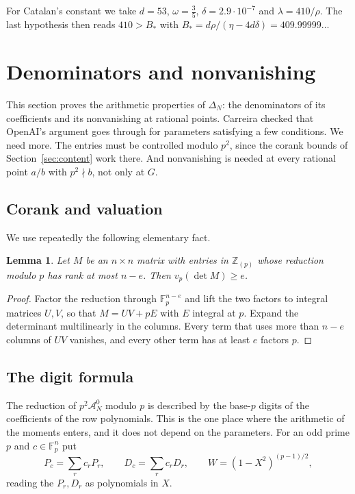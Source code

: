 \documentclass[11pt]{amsart}
\newcommand{\Bstar}{409.99999}
\newtheorem{lemma}[theorem]{Lemma}
\theoremstyle{definition}
\theoremstyle{remark}
\numberwithin{equation}{section}
\newcommand{\Z}{\mathbb Z}
\newcommand{\F}{\mathbb F}
\newcommand{\cA}{\mathcal A}
\begin{document}
For Catalan's constant we take $d=53$, $\omega=\frac35$, $\delta=2.9\cdot10^{-7}$ and $\lambda=410/\rho$.
The last hypothesis then reads $410>B_*$ with $B_*=d\rho/(\eta-4d\delta)=\Bstar\ldots$

\section{Denominators and nonvanishing}\label{sec:setup}

This section proves the arithmetic properties of $\Delta_N$: the denominators of its coefficients and its
nonvanishing at rational points. Carreira \cite{Carreira2026} checked that OpenAI's argument goes through
for parameters satisfying a few conditions. We need more. The entries must be controlled modulo $p^2$,
since the corank bounds of Section~\ref{sec:content} work there. And nonvanishing is needed at every
rational point $a/b$ with $p^2\nmid b$, not only at $G$.

\subsection{Corank and valuation}
We use repeatedly the following elementary fact.

\begin{lemma}\label{lem:rank-valuation}
Let $M$ be an $n\times n$ matrix with entries in $\Z_{(p)}$ whose reduction modulo $p$ has rank at most
$n-e$. Then $v_p(\det M)\ge e$.
\end{lemma}

\begin{proof}
Factor the reduction through $\F_p^{n-e}$ and lift the two factors to integral matrices $U,V$, so that
$M=UV+pE$ with $E$ integral at $p$. Expand the determinant multilinearly in the columns. Every term that
uses more than $n-e$ columns of $UV$ vanishes, and every other term has at least $e$ factors $p$.
\end{proof}

\subsection{The digit formula}
The reduction of $p^2\cA^0_N$ modulo $p$ is described by the base-$p$ digits of the coefficients of the
row polynomials. This is the one place where the arithmetic of the moments enters, and it does not depend
on the parameters. For an odd prime $p$ and $c\in\F_p^n$ put
\[
 P_c=\sum_rc_rP_r,\qquad D_c=\sum_rc_rD_r,\qquad W=(1-X^2)^{(p-1)/2},
\]
reading the $P_r,D_r$ as polynomials in $X$.
\end{document}
